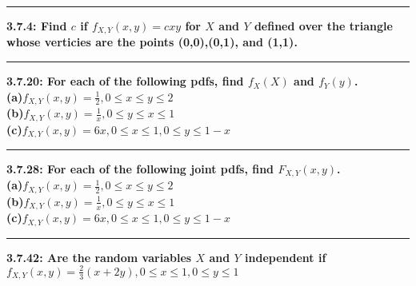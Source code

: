 \documentclass[11pt]{article}
\newcommand\question[2]{\vspace{.25in}\hrule\textbf{#1: #2}\vspace{.5em}\vspace{.10in}}
\renewcommand\part[1]{\vspace{.10in}\textbf{(#1)}}
\begin{document}
\raggedright
\newcommand\NAME{Jonathan Lopez}  %
\newcommand\HWNUM{5}              %



\question{3.7.4}
{Find $c$ if $f_{X,Y}(x,y) = cxy$ for $X$ and $Y$ defined over the triangle whose
verticies are the points (0,0),(0,1), and (1,1).}


\question{3.7.20}
{For each of the following pdfs, find $f_{X}(X)$ and $f_{Y}(y)$.}
\\

\part{a}{$f_{X,Y}(x,y) = \frac{1}{2},0 \leq x \leq y \leq 2$}
\\
\part{b}{$f_{X,Y}(x,y) = \frac{1}{x},0 \leq y \leq x \leq 1$}
\\
\part{c}{$f_{X,Y}(x,y) = 6x,0 \leq x \leq 1,0 \leq y \leq 1-x$}



\question{3.7.28}
{For each of the following joint pdfs, find $F_{X,Y}(x,y)$.}
\\

\part{a}{$f_{X,Y}(x,y) = \frac{1}{2},0 \leq x \leq y \leq 2$}
\\
\part{b}{$f_{X,Y}(x,y) = \frac{1}{x},0 \leq y \leq x \leq 1$}
\\
\part{c}{$f_{X,Y}(x,y) = 6x,0 \leq x \leq 1,0 \leq y \leq 1-x$}


\question{3.7.42}
{Are the random variables $X$ and $Y$ independent if
$f_{X,Y}(x,y) = \frac{2}{3}(x+2y),0 \leq x \leq 1,0 \leq y \leq 1$
}
\end{document}
